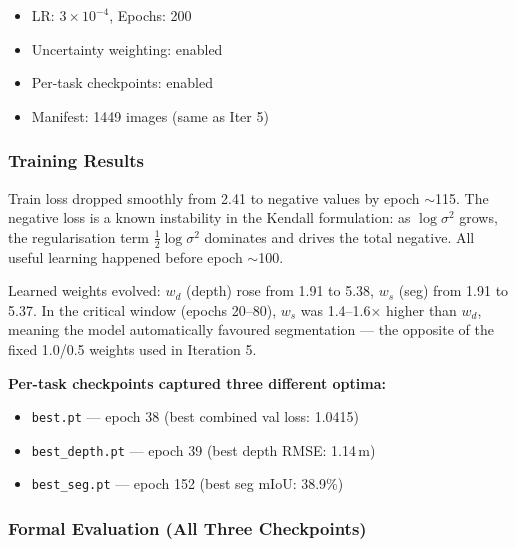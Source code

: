 \documentclass[11pt,a4paper]{article}
\begin{document}
\begin{itemize}[nosep]
  \item LR: $3 \times 10^{-4}$, Epochs: 200
  \item Uncertainty weighting: enabled
  \item Per-task checkpoints: enabled
  \item Manifest: 1449 images (same as Iter 5)
\end{itemize}

\subsubsection{Training Results}

Train loss dropped smoothly from 2.41 to negative values by epoch
$\sim$115. The negative loss is a known instability in the Kendall
formulation: as $\log \sigma^2$ grows, the regularisation term
$\frac{1}{2}\log \sigma^2$ dominates and drives the total negative.
All useful learning happened before epoch $\sim$100.

Learned weights evolved: $w_d$ (depth) rose from 1.91 to 5.38, $w_s$
(seg) from 1.91 to 5.37. In the critical window (epochs 20--80), $w_s$
was 1.4--1.6$\times$ higher than $w_d$, meaning the model automatically
favoured segmentation --- the opposite of the fixed 1.0/0.5 weights
used in Iteration 5.

\textbf{Per-task checkpoints captured three different optima:}
\begin{itemize}[nosep]
  \item \texttt{best.pt} --- epoch 38 (best combined val loss: 1.0415)
  \item \texttt{best\_depth.pt} --- epoch 39 (best depth RMSE: 1.14\,m)
  \item \texttt{best\_seg.pt} --- epoch 152 (best seg mIoU: 38.9\%)
\end{itemize}

\subsubsection{Formal Evaluation (All Three Checkpoints)}
\end{document}
